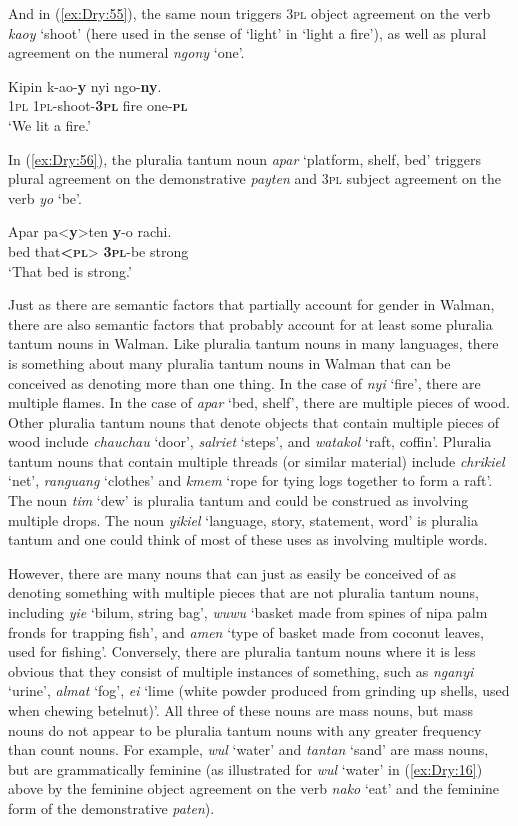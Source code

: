 \documentclass[output=collectionpaper]{langsci/langscibook}
\begin{document}
And in (\ref{ex:Dry:55}), the same noun triggers \textsc{3pl} object agreement on the verb \textit{kaoy} `shoot' (here used in the sense of `light' in `light a fire'), as well as plural agreement on the numeral \textit{ngony} `one'.

\ea \label{ex:Dry:55}
\gll Kipin	k-ao-\textbf{y}	nyi	ngo-\textbf{ny}.\\
\textsc{1pl} \textsc{1pl}-shoot-\textbf{\textsc{3pl}} fire one-\textbf{\textsc{pl}}\\
\glt `We lit a fire.'
\z

In (\ref{ex:Dry:56}), the pluralia tantum noun \textit{apar} `platform, shelf, bed' triggers plural agreement on the demonstrative \textit{payten} and \textsc{3pl} subject agreement on the verb \textit{yo} `be'.

\ea  \label{ex:Dry:56}
\gll Apar	pa<\textbf{y}>ten	\textbf{y}-o	rachi.\\
bed that\textbf{<\textsc{pl}}> \textbf{\textsc{3pl}}-be strong\\
\glt `That bed is strong.'
\z

Just as there are semantic factors that partially account for gender in Walman, there are also semantic factors that probably account for at least some pluralia tantum nouns in Walman. Like pluralia tantum nouns in many languages, there is something about many pluralia tantum nouns in Walman that can be conceived as denoting more than one thing. In the case of \textit{nyi} `fire', there are multiple flames. In the case of \textit{apar} `bed, shelf', there are multiple pieces of wood. Other pluralia tantum nouns that denote objects that contain multiple pieces of wood include \textit{chauchau} `door', \textit{salriet} `steps', and \textit{watakol} `raft, coffin'. Pluralia tantum nouns that contain multiple threads (or similar material) include \textit{chrikiel} `net', \textit{ranguang} `clothes' and \textit{kmem} `rope for tying logs together to form a raft'. The noun \textit{tim} `dew' is pluralia tantum and could be construed as involving multiple drops. The noun \textit{yikiel} `language, story, statement, word' is pluralia tantum and one could think of most of these uses as involving multiple words.

However, there are many nouns that can just as easily be conceived of as denoting something with multiple pieces that are not pluralia tantum nouns, including \textit{yie} `bilum, string bag', \textit{wuwu} `basket made from spines of nipa palm fronds for trapping fish', and \textit{amen} `type of basket made from coconut leaves, used for fishing'. Conversely, there are pluralia tantum nouns where it is less obvious that they consist of multiple instances of something, such as \textit{nganyi} `urine',  \textit{almat} `fog', \textit{ei} `lime (white powder produced from grinding up shells, used when chewing betelnut)'. All three of these nouns are mass nouns, but mass nouns do not appear to be pluralia tantum nouns with any greater frequency than count nouns. For example, \textit{wul} `water' and \textit{tantan} `sand' are mass nouns, but are grammatically feminine (as illustrated for \textit{wul} `water' in (\ref{ex:Dry:16}) above by the feminine object agreement on the verb \textit{nako} `eat' and the feminine form of the demonstrative \textit{paten}).
\end{document}
